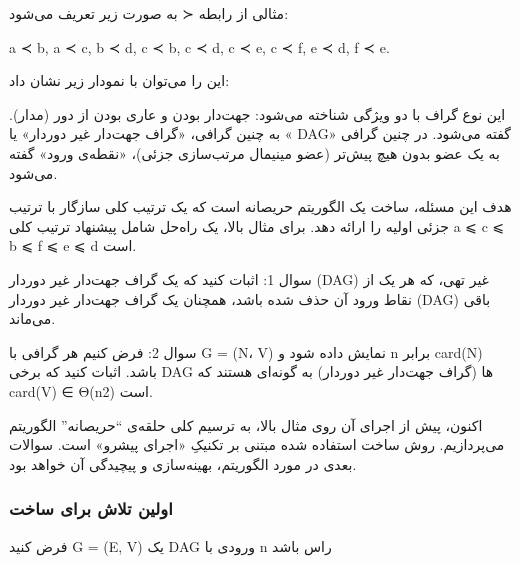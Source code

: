 \documentclass{book} %
\begin{document}
مثالی از رابطه ≺ به صورت زیر تعریف می‌شود:

a ≺ b, a ≺ c, b ≺ d, c ≺ b, c ≺ d, c ≺ e, c ≺ f, e ≺ d, f ≺ e.

این را می‌توان با نمودار زیر نشان داد:

این نوع گراف با دو ویژگی شناخته می‌شود: جهت‌دار بودن و عاری بودن از دور
(مدار). به چنین گرافی، «گراف جهت‌دار غیر دوردار» یا « DAG» گفته می‌شود. در چنین
گرافی به یک عضو بدون هیچ پیش‌تر (عضو مینیمال مرتب‌سازی جزئی)، «نقطه‌ی ورود»
گفته می‌شود.

هدف این مسئله، ساخت یک الگوریتم حریصانه است که یک ترتیب کلی سازگار با ترتیب جزئی اولیه را ارائه دهد. برای مثال بالا، یک راه‌حل شامل پیشنهاد ترتیب کلی a ⩽ c ⩽ b ⩽ f ⩽ e ⩽ d  است.

سوال 1: اثبات کنید که یک گراف جهت‌دار غیر دوردار (DAG) غیر تهی، که هر یک از نقاط ورود آن حذف
شده باشد، همچنان یک گراف جهت‌دار غیر دوردار (DAG) باقی می‌ماند.


سوال 2: فرض کنیم هر گرافی با G = (N، V) نمایش داده شود و n برابر card(N) باشد.
اثبات کنید که برخی DAG ها (گراف جهت‌دار غیر دوردار) به گونه‌ای هستند که card(V) ∈ Θ(n2)
است.

اکنون، پیش از اجرای آن روی مثال بالا، به ترسیم کلی حلقه‌ی “حریصانه” الگوریتم می‌پردازیم.
روش ساخت استفاده شده مبتنی بر تکنیکِ «اجرای پیشرو» است. سوالات بعدی در مورد
الگوریتم، بهینه‌سازی و پیچیدگی آن خواهد بود.

\newpage

\subsubsection*{اولین تلاش برای ساخت}
فرض کنید G = (E, V) یک DAG ورودی با n راس باشد
\end{document}
